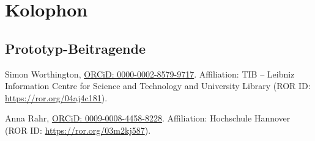 \documentclass[
  a4paper,
  openany]{book}
\begin{document}

\chapter{Kolophon}\label{kolophon}

\section{Prototyp-Beitragende}\label{prototyp-beitragende}

Simon Worthington, \href{https://orcid.org/0000-0002-8579-9717}{ORCiD:
0000-0002-8579-9717}. Affiliation: TIB -- Leibniz Information Centre for
Science and Technology and University Library (ROR ID:
\url{https://ror.org/04aj4c181}).

Anna Rahr, \href{https://orcid.org/0009-0008-4458-8228}{ORCiD:
0009-0008-4458-8228}. Affiliation: Hochschule Hannover (ROR ID:
\url{https://ror.org/03m2kj587}).


\backmatter

\printindex







\bigbreak





\vfill

\vspace{1\baselineskip} 

\begin{tcolorbox}
\centering


\end{tcolorbox}
\end{document}
